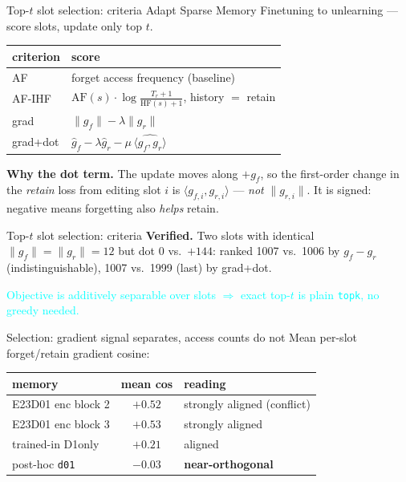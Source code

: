 \documentclass{beamer}
\newcommand{\pierre}[1]{\textcolor{cyan}{#1}}
\newcommand{\gf}{\ensuremath{g_f}}
\newcommand{\gr}{\ensuremath{g_r}}
\newcommand{\gfi}{\ensuremath{g_{f,i}}}
\newcommand{\gri}{\ensuremath{g_{r,i}}}
\begin{document}
\begin{frame}{Top-$t$ slot selection: criteria}
Adapt Sparse Memory Finetuning to unlearning --- score slots, update only top $t$.
\begin{center}
\begin{tabular}{|l|l|}
\hline
criterion & score \\
\hline
AF      & forget access frequency (baseline) \\
AF-IHF  & $\text{AF}(s)\cdot\log\frac{T_r+1}{\text{HF}(s)+1}$, history $=$ retain \\
grad    & $\|\gf\| - \lambda\|\gr\|$ \\
grad+dot & $\hat{g}_f - \lambda\hat{g}_r - \mu\,\widehat{\langle \gf,\gr\rangle}$ \\
\hline
\end{tabular}
\end{center}

\textbf{Why the dot term.} The update moves along $+\gf$, so the first-order
change in the \emph{retain} loss from editing slot $i$ is
$\langle \gfi, \gri \rangle$ --- \emph{not} $\|\gri\|$. It is signed:
negative means forgetting also \emph{helps} retain.

\end{frame}

\begin{frame}{Top-$t$ slot selection: criteria}
\textbf{Verified.} Two slots with identical $\|\gf\|=\|\gr\|=12$ but dot $0$
vs.\ $+144$: ranked 1007 vs.\ 1006 by $\gf-\gr$ (indistinguishable), 1007
vs.\ 1999 (last) by grad+dot.

\medskip
\pierre{Objective is additively separable over slots $\Rightarrow$ exact top-$t$
is plain \texttt{topk}, no greedy needed.}
\end{frame}

\begin{frame}{Selection: gradient signal separates, access counts do not}
Mean per-slot forget/retain gradient cosine:
\begin{center}
\begin{tabular}{|l|c|l|}
\hline
memory & mean cos & reading \\
\hline
E23D01 enc block 2 & $+0.52$ & strongly aligned (conflict) \\
E23D01 enc block 3 & $+0.53$ & strongly aligned \\
trained-in D1only  & $+0.21$ & aligned \\
post-hoc \texttt{d01} & $-0.03$ & \textbf{near-orthogonal} \\
\hline
\end{tabular}
\end{center}

\end{frame}
\end{document}
